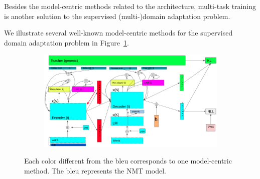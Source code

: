Besides the model-centric methods related to the architecture, multi-task training is another solution to the supervised (multi-)domain adaptation problem. 

We illustrate several well-known model-centric methods for the supervised domain adaptation problem in Figure~\ref{fig:model-centric-case1-case2}.
\begin{figure}[htbp]
\begin{subfigure}{1.0\textwidth}
  \centering
  \includegraphics[width=1.0\textwidth]{graphics/supervised_mdmt}
\end{subfigure}
\newline
\begin{subfigure}{1.0\textwidth}
  \centering
\end{subfigure}
\caption[Model-centric's brief overview]{Each color different from the bleu corresponds to one model-centric method. The bleu represents the NMT model.}
\label{fig:model-centric-case1-case2}
\end{figure}

